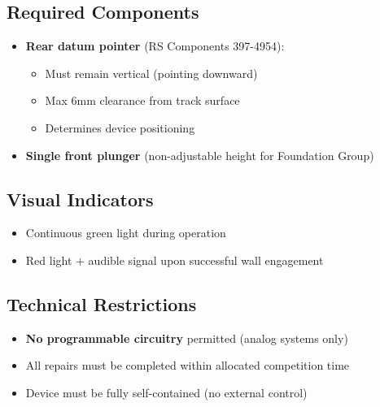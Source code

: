 \documentclass{article}
\begin{document}
\subsection{Required Components}
\begin{itemize}[itemsep=-0.7mm]
	\item \textbf{Rear datum pointer} (RS Components 397-4954):
	\begin{itemize}[noitemsep,topsep=0pt]
		\item Must remain vertical (pointing downward)
		\item Max 6mm clearance from track surface
		\item Determines device positioning
	\end{itemize}
	\item \textbf{Single front plunger} (non-adjustable height for Foundation Group)
\end{itemize}

\subsection{Visual Indicators}
\begin{itemize}[noitemsep,topsep=0pt]
	\item Continuous green light during operation
	\item Red light + audible signal upon successful wall engagement
\end{itemize}

\subsection{Technical Restrictions}
\begin{itemize}[itemsep=-0.7mm,topsep=0pt]
	\item \textbf{No programmable circuitry} permitted (analog systems only)
	\item All repairs must be completed within allocated competition time
	\item Device must be fully self-contained (no external control)
\end{itemize}
\end{document}
